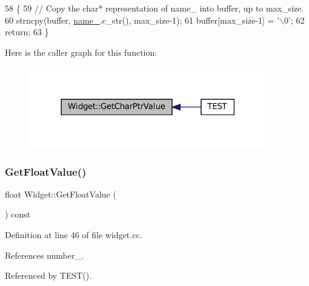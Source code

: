 \begin{DoxyCode}
58                                                                 \{
59   \textcolor{comment}{// Copy the char* representation of name\_ into buffer, up to max\_size.}
60   strncpy(buffer, \hyperlink{classWidget_a1d2f74810f3f912270a681e0671a7a55}{name\_}.c\_str(), max\_size-1);
61   buffer[max\_size-1] = \textcolor{charliteral}{'\(\backslash\)0'};
62   \textcolor{keywordflow}{return};
63 \}
\end{DoxyCode}
Here is the caller graph for this function\+:
\nopagebreak
\begin{figure}[H]
\begin{center}
\leavevmode
\includegraphics[width=294pt]{classWidget_a50791a556979f22f5593383143c7f815_icgraph}
\end{center}
\end{figure}
\mbox{\label{classWidget_abf639d975e02cabda8132873aca1a333}} 
\subsubsection{\texorpdfstring{Get\+Float\+Value()}{GetFloatValue()}}
{\footnotesize\ttfamily float Widget\+::\+Get\+Float\+Value (\begin{DoxyParamCaption}{ }\end{DoxyParamCaption}) const}



Definition at line 46 of file widget.\+cc.



References number\+\_\+.



Referenced by T\+E\+S\+T().


